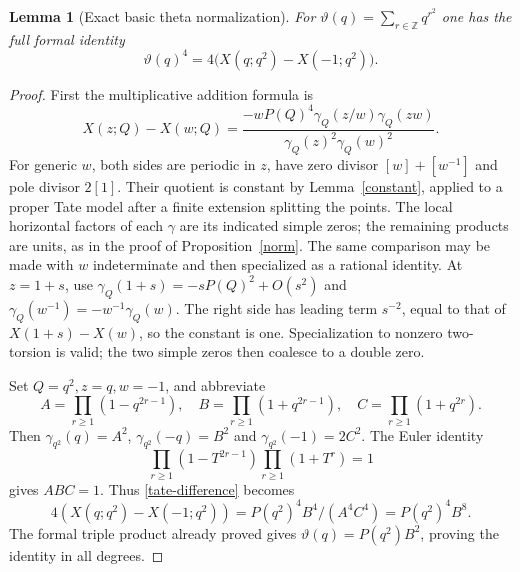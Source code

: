 \documentclass[11pt]{article}
\newtheorem{lemma}[theorem]{Lemma}
\theoremstyle{remark}\newtheorem{remark}[theorem]{Remark}
\newcommand{\Z}{\mathbb Z}\newcommand{\Q}{\mathbb Q}
\begin{document}
\begin{lemma}[Exact basic theta normalization]\label{basic-fourth}
For $\vartheta(q)=\sum_{r\in\Z}q^{r^2}$ one has the full formal identity
\[
 \vartheta(q)^4=4\bigl(X(q;q^2)-X(-1;q^2)\bigr).
\]
\end{lemma}
\begin{proof}
First the multiplicative addition formula is
\begin{equation}\label{tate-difference}
 X(z;Q)-X(w;Q)
 =\frac{-wP(Q)^4\gamma_Q(z/w)\gamma_Q(zw)}
        {\gamma_Q(z)^2\gamma_Q(w)^2}.
\end{equation}
For generic $w$, both sides are periodic in $z$, have zero divisor
$[w]+[w^{-1}]$ and pole divisor $2[1]$. Their quotient is constant by
Lemma~\ref{constant}, applied to a proper Tate model after a finite
extension splitting the points. The local horizontal factors of each
$\gamma$ are its indicated simple zeros; the remaining products are
units, as in the proof of Proposition~\ref{norm}. The same comparison
may be made with $w$ indeterminate and then specialized as a rational
identity. At $z=1+s$, use
$\gamma_Q(1+s)=-sP(Q)^2+O(s^2)$ and
$\gamma_Q(w^{-1})=-w^{-1}\gamma_Q(w)$. The right side has leading term
$s^{-2}$, equal to that of $X(1+s)-X(w)$, so the constant is one.
Specialization to nonzero two-torsion is valid; the two simple zeros
then coalesce to a double zero.

Set $Q=q^2,z=q,w=-1$, and abbreviate
\[
 A=\prod_{r\geq1}(1-q^{2r-1}),\quad
 B=\prod_{r\geq1}(1+q^{2r-1}),\quad
 C=\prod_{r\geq1}(1+q^{2r}).
\]
Then $\gamma_{q^2}(q)=A^2$, $\gamma_{q^2}(-q)=B^2$ and
$\gamma_{q^2}(-1)=2C^2$. The Euler identity
\[
 \prod_{r\geq1}(1-T^{2r-1})\prod_{r\geq1}(1+T^r)=1
\]
gives $ABC=1$. Thus \eqref{tate-difference} becomes
\[
 4(X(q;q^2)-X(-1;q^2))
   =P(q^2)^4 B^4/(A^4C^4)=P(q^2)^4B^8.
\]
The formal triple product already proved gives
$\vartheta(q)=P(q^2)B^2$, proving the identity in all degrees.
\end{proof}
\end{document}
